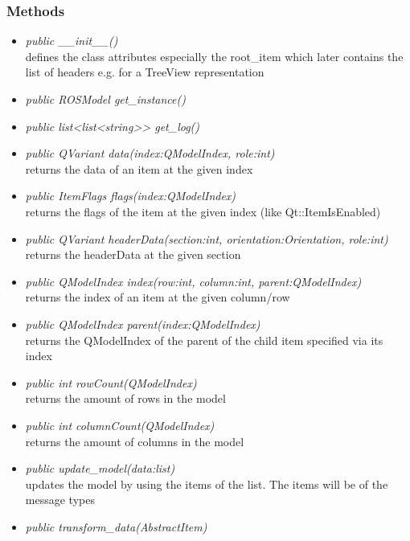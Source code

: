 \subsubsection{Methods}
\begin{itemize}
  \item \textit{public \_\_init\_\_()}\\ 
  defines the class attributes especially the root\_item which later contains the list of headers e.g. for a TreeView representation
  \item \textit{public ROSModel get\_instance()}\\
  
  \item \textit{public list<list<string>> get\_log()}\\
  
  \item \textit{public QVariant data(index:QModelIndex, role:int)}\\
  returns the data of an item at the given index
  \item \textit{public ItemFlags flags(index:QModelIndex)}\\
  returns the flags of the item at the given index (like Qt::ItemIsEnabled)
  \item \textit{public QVariant headerData(section:int, orientation:Orientation,
  role:int)}\\ 
  returns the headerData  at the given section
  \item \textit{public QModelIndex index(row:int, column:int,
  parent:QModelIndex)}\\
  returns the index of an item at the given column/row
  \item \textit{public QModelIndex parent(index:QModelIndex)}\\ 
  returns the QModelIndex of the parent of the child item specified via its index
  \item \textit{public int rowCount(QModelIndex)}\\ 
  returns the amount of rows in the model
  \item \textit{public int columnCount(QModelIndex)}\\
  returns the amount of columns in the model
  \item \textit{public update\_model(data:list)}\\ 
  updates the model by using the items of the list. The items will be of the message types 
  \item \textit{public transform\_data(AbstractItem)}\\ 

\end{itemize}
